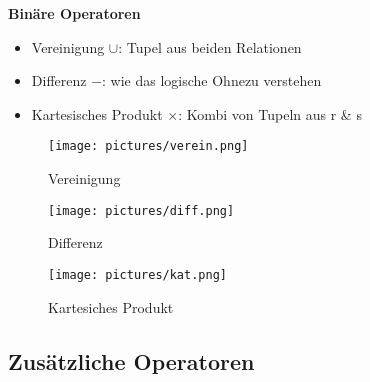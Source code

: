 \documentclass[12pt,a4paper]{article}
\begin{document}
\noindent
\textbf{Binäre Operatoren}
\begin{itemize}
\item Vereinigung $\cup$: Tupel aus beiden Relationen
\item Differenz $-$: wie das logische \glqq Ohne\grqq zu verstehen
\item Kartesisches Produkt $\times$: Kombi von Tupeln aus r \& s
\end{itemize}

\begin{figure}[H]
\begin{minipage}[t]{.33\textwidth}
\centering
\texttt{[image: pictures/verein.png]}
\caption{Vereinigung}
\end{minipage}
\hfill
\begin{minipage}[t]{.33\textwidth}
\centering
\texttt{[image: pictures/diff.png]}
\caption{Differenz}
\end{minipage}
\hfill
\begin{minipage}[t]{.33\textwidth}
\centering
\texttt{[image: pictures/kat.png]}
\caption{Kartesiches Produkt}
\end{minipage}
\end{figure}

\subsection{Zusätzliche Operatoren}
\end{document}
